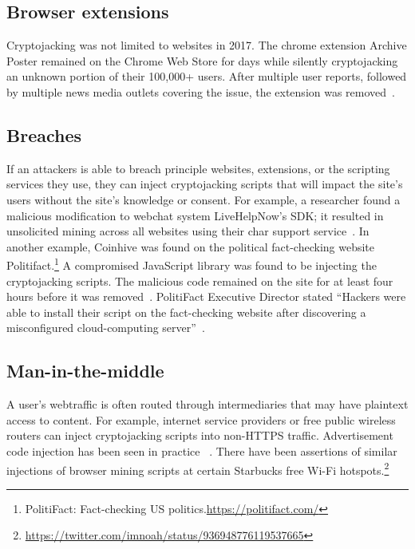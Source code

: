 \subsection{Browser extensions} 

Cryptojacking was not limited to websites in 2017. The chrome extension Archive Poster remained on the Chrome Web Store for days while silently cryptojacking an unknown portion of their 100,000+ users. After multiple user reports, followed by multiple news media outlets covering the issue, the extension was removed~\cite{chromeextentioncoinhive}. 

\subsection{Breaches} 

If an attackers is able to breach principle websites, extensions, or the scripting services they use, they can inject cryptojacking scripts that will impact the site's users without the site's knowledge or consent. For example, a researcher found a malicious modification to webchat system LiveHelpNow's SDK; it resulted in unsolicited mining across all websites using their char support service~\cite{chatsupporthack}. In another example, Coinhive was found on the political fact-checking website Politifact.\footnote{PolitiFact: Fact-checking US politics.\url{https://politifact.com/}} A compromised JavaScript library was found to be injecting the cryptojacking scripts. The malicious code remained on the site for at least four hours before it was removed~\cite{politifactcoinhive}. PolitiFact Executive Director stated ``Hackers were able to install their script on the fact-checking website after discovering a misconfigured cloud-computing server''~\cite{politifactcoinhivewsj}.


\subsection{Man-in-the-middle} 

A user's webtraffic is often routed through intermediaries that may have plaintext access to content. For example, internet service providers or free public wireless routers can inject cryptojacking scripts into non-HTTPS traffic. Advertisement code injection has been seen in practice ~\cite{vergeadinjection}. There have been assertions of similar injections of browser mining scripts at certain Starbucks free Wi-Fi hotspots.\footnote{\url{https://twitter.com/imnoah/status/936948776119537665}}






